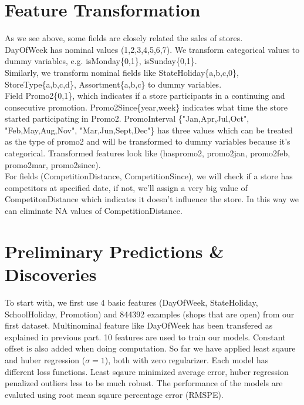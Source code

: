 \documentclass[11pt]{article}
\begin{document}
\section{Feature Transformation}
As we see above, some fields are closely related the sales of stores. \\
DayOfWeek has nominal values (1,2,3,4,5,6,7). We transform categorical values to dummy variables, e.g. isMonday\{0,1\}, isSunday\{0,1\}.\\
Similarly, we transform nominal fields like StateHoliday\{a,b,c,0\}, StoreType\{a,b,c,d\}, Assortment\{a,b,c\} to dummy variables.\\
Field Promo2\{0,1\}, which indicates if a store participants in a continuing and consecutive promotion. Promo2Since\{year,week\} indicates what time the store started participating in Promo2. PromoInterval \{"Jan,Apr,Jul,Oct", "Feb,May,Aug,Nov", "Mar,Jun,Sept,Dec"\} has three values which can be treated as the type of promo2 and will be transformed to dummy variables because it's categorical. Transformed features look like (haspromo2, promo2jan, promo2feb, promo2mar, promo2since).\\
For fields (CompetitionDistance, CompetitionSince), we will check if a store has competitors at specified date, if not, we'll assign a very big value of CompetitonDistance which indicates it doesn't influence the store. In this way we can eliminate NA values of CompetitionDistance.

\section{Preliminary Predictions \& Discoveries}
To start with, we first use 4 basic features (DayOfWeek, StateHoliday, SchoolHoliday, Promotion) and 844392 examples (shops that are open) from our first dataset. Multinominal feature like DayOfWeek has been transfered as explained in previous part. 10 features are used to train our models. Constant offset is also added when doing computation. So far we have applied least sqaure and huber regression ($\sigma=1$), both with zero regularizer. Each model has different loss functions. Least sqaure minimized average error, huber regression penalized outliers less to be much robust. The performance of the models are evaluted using root mean sqaure percentage error (RMSPE).
\end{document}
